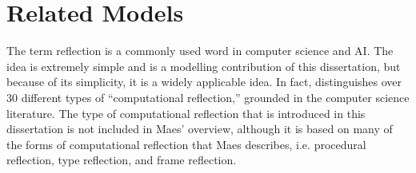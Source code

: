 \chapter{Related Models}
\label{chapter:related_models}

The term reflection is a commonly used word in computer science and
AI.  The idea is extremely simple and is a modelling contribution of
this dissertation, but because of its simplicity, it is a widely
applicable idea.  In fact, \cite{maes:1987,maes:1988} distinguishes
over 30 different types of ``computational reflection,'' grounded in
the computer science literature.  The type of computational reflection
that is introduced in this dissertation is not included in Maes'
overview, although it is based on many of the forms of computational
reflection that Maes describes, i.e. procedural reflection, type
reflection, and frame reflection.

